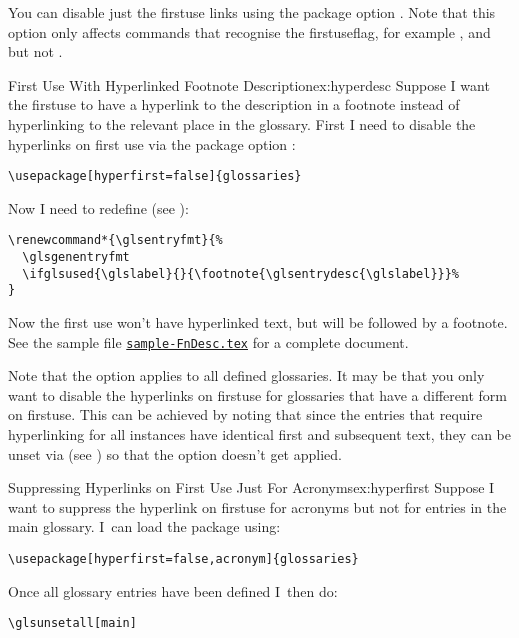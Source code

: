 \documentclass[report,inlinetitle]{nlctdoc}
\newcommand*{\firstuseflag}{\gls{firstuseflag}}
\newcounter{sample}
\newcommand*{\samplefile}[2][sample]{%
  \hyperref[ex:#1#2]{\texttt{#1#2.tex}}}
\begin{document}
You can disable just the \gls{firstuse} links using the package
option . Note that this option only
affects commands that recognise the \firstuseflag, for example
,  and  but not .

\begin{example}{First Use With Hyperlinked Footnote Description}{ex:hyperdesc}
Suppose I want the \gls*{firstuse} to have a hyperlink to the
description in a footnote instead of hyperlinking to the relevant
place in the glossary. First I need to disable the hyperlinks on
first use via the package option :
\begin{verbatim}
\usepackage[hyperfirst=false]{glossaries}
\end{verbatim}
Now I need to redefine  (see
):
\begin{verbatim}
\renewcommand*{\glsentryfmt}{%
  \glsgenentryfmt
  \ifglsused{\glslabel}{}{\footnote{\glsentrydesc{\glslabel}}}%
}
\end{verbatim}

Now the first use won't have hyperlinked text, but will be followed
by a footnote.
See the sample file \samplefile{-FnDesc} for a complete document.
\end{example}

Note that the  option applies to all defined glossaries.  It
may be that you only want to disable the hyperlinks on
\gls{firstuse} for glossaries that have a different form on
\gls*{firstuse}. This can be achieved by noting that since the
entries that require hyperlinking for all instances have identical
first and subsequent text, they can be unset via 
(see ) so that the 
option doesn't get applied.

\begin{example}{Suppressing Hyperlinks on First Use Just For
Acronyms}{ex:hyperfirst}
Suppose I want to suppress the hyperlink on \gls{firstuse} for
acronyms but not for entries in the main glossary.  I~can load
the  package using:
\begin{verbatim}
\usepackage[hyperfirst=false,acronym]{glossaries}
\end{verbatim}
Once all glossary entries have been defined I~then do:
\begin{verbatim}
\glsunsetall[main]
\end{verbatim}

\end{example}
\end{document}
